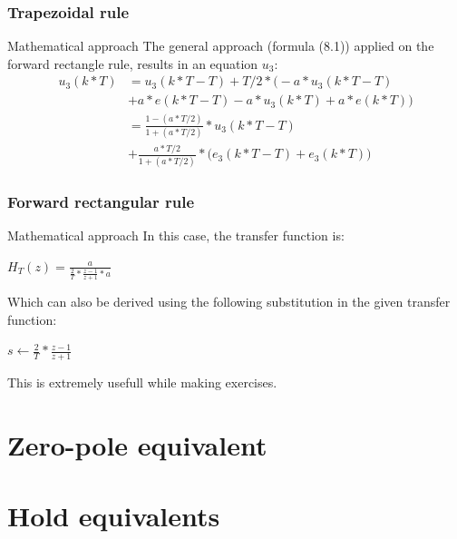 \begin{frame}
	\frametitle{Trapezoidal rule}
	\begin{block}{Mathematical approach}
		The general approach (formula (8.1)) applied on the forward rectangle rule, results in an equation $u_3$:
		\begin{align*}
		u_3(k*T)& =u_3(k*T - T) + T/2*\big(-a*u_3(k*T - T)\\
		& + a*e(k*T - T) - a*u_3(k*T) + a*e(k*T)\big)\\
		& =\frac{1-(a*T/2)}{1 + (a*T/2)}*u_3(k*T - T)\\
		& +\frac{a*T/2}{1 + (a*T/2)} * \big(e_3(k*T - T) + e_3(k*T)\big)
		\end{align*}
	\end{block}
\end{frame}

\begin{frame}
	\frametitle{Forward rectangular rule}
	\begin{block}{Mathematical approach}
		In this case, the transfer function is:
		\begin{center}
			$H_T(z) = \frac{a}{\frac{2}{T}*\frac{z-1}{z+1} * a }$
		\end{center}
		Which can also be derived using the following substitution in the given transfer function:
		\begin{center}
			$s \gets \frac{2}{T} * \frac{z-1}{z+1}$
		\end{center}
		This is extremely usefull while making exercises.
	\end{block}
\end{frame}

\section{Zero-pole equivalent}

\section{Hold equivalents}
